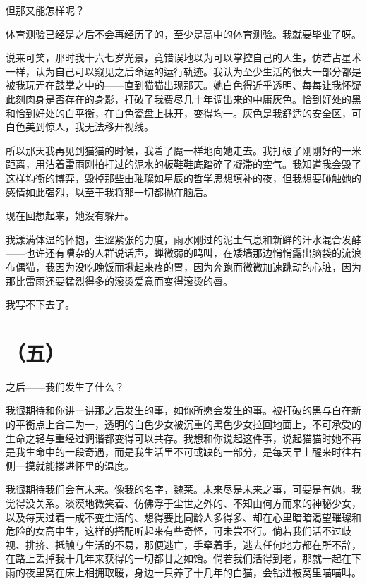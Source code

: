 \documentclass{article}
\begin{document}
但那又能怎样呢？



体育测验已经是之后不会再经历了的，至少是高中的体育测验。我就要毕业了呀。



说来可笑，那时我十六七岁光景，竟错误地以为可以掌控自己的人生，仿若占星术一样，认为自己可以窥见之后命运的运行轨迹。我认为至少生活的很大一部分都是被我玩弄在鼓掌之中的——直到猫猫出现那天。她白色得近乎透明、每每让我怀疑此刻肉身是否存在的身影，打破了我费尽几十年调出来的中庸灰色。恰到好处的黑和恰到好处的白平衡，在白色瓷盘上抹开，变得均一。灰色是我舒适的安全区，可白色美到惊人，我无法移开视线。



所以那天我再见到猫猫的时候，我着了魔一样地向她走去。我打破了刚刚好的一米距离，用沾着雷雨刚拍打过的泥水的板鞋鞋底踏碎了凝滞的空气。我知道我会毁了这样均衡的博弈，毁掉那些由璀璨如星辰的哲学思想填补的夜，但我想要碰触她的感情如此强烈，以至于我将那一切都抛在脑后。



现在回想起来，她没有躲开。



我漾满体温的怀抱，生涩紧张的力度，雨水刚过的泥土气息和新鲜的汗水混合发酵——也许还有嘈杂的人群说话声，蝉微弱的鸣叫，在矮墙那边悄悄露出脑袋的流浪布偶猫，我因为没吃晚饭而揪起来疼的胃，因为奔跑而微微加速跳动的心脏，因为那比雷雨还要猛烈得多的滚烫爱意而变得滚烫的唇。



我写不下去了。





{\centering\section*{（五）}}





之后——我们发生了什么？



我很期待和你讲一讲那之后发生的事，如你所愿会发生的事。被打破的黑与白在新的平衡点上合二为一，透明的白色少女被沉重的黑色少女拉回地面上，不可承受的生命之轻与重经过调谐都变得可以共存。我想和你说起这件事，说起猫猫时她不再是我生命中的一段奇遇，而是我生活里不可或缺的一部分，是每天早上醒来时往右侧一摸就能搂进怀里的温度。



我很期待我们会有未来。像我的名字，魏莱。未来尽是未来之事，可要是有她，我觉得没关系。淡漠地微笑着、仿佛浮于尘世之外的、不知由何方而来的神秘少女，以及每天过着一成不变生活的、想得要比同龄人多得多、却在心里暗暗渴望璀璨和危险的女高中生，这样的搭配听起来有些奇怪，可未尝不行。倘若我们活不过歧视、排挤、抵触与生活的不易，那便逃亡，手牵着手，逃去任何地方都在所不辞，在路上丢掉我十几年来获得的一切都甘之如饴。倘若我们活得到老，那就一起在下雨的夜里窝在床上相拥取暖，身边一只养了十几年的白猫，会钻进被窝里喵喵叫。
\end{document}
